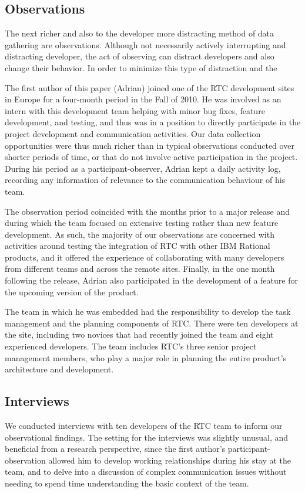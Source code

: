 \subsection{Observations}
The next richer and also to the developer more distracting method of data gathering are observations.
Although not necessarily actively interrupting and distracting developer, the act of observing can distract developers and also change their behavior.
In order to minimize this type of distraction and the 




The first author of this paper (Adrian) joined one of the RTC development sites in Europe for a four-month period in the Fall of 2010. He was involved as an intern with this development team helping with minor bug fixes, feature development, and testing, and thus was in a position to directly participate in the project development and communication activities. Our data collection opportunities were thus much richer than in typical observations conducted over shorter periods of time, or that do not involve active participation in the project.  During his period as a participant-observer, Adrian kept a daily activity log, recording any information of relevance to the communication behaviour of his team.

The observation period coincided with the months prior to a major release and during which the team focused on extensive testing rather than new feature development. As such, the majority of our observations are concerned with activities around testing the integration of RTC with other IBM Rational products, and it offered the experience of collaborating with many developers from different teams and across the remote sites. Finally, in the one month following the release, Adrian also participated in the development of a feature for the upcoming version of the product.

The team in which he was embedded had the responsibility to develop the task management and the planning components of RTC. There were ten developers at the site, including two novices that had recently joined the team and eight experienced developers. The team includes RTC's three senior project management members, who play a major role in planning the entire product's architecture and development.

\subsection{Interviews}
We conducted interviews with ten developers of the RTC team to inform our observational findings. The setting for the interviews was slightly unusual, and beneficial from a research perspective, since the first author's participant-observation allowed him to develop working relationships during his stay at the team, and to delve into a discussion of complex communication issues without needing to spend time understanding the basic context of the team.

